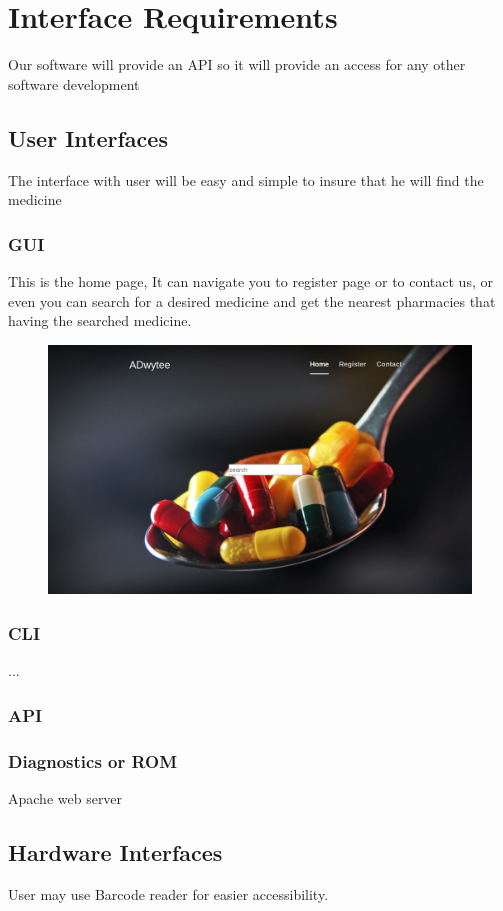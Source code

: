 \documentclass[]{article}
\begin{document}
\section{Interface Requirements}
Our software will provide an API so it will provide an access for any other software development
\subsection{User Interfaces}
The interface with user will be easy and simple to insure  that he will find the medicine
\subsubsection {GUI}
This is the home page, It can navigate you to register page or to contact us, or even you can search for a desired medicine and get the nearest pharmacies that having the searched medicine.

\begin{figure}[H]
\centering
\includegraphics[scale=0.2]{./Home}
\end{figure}

\subsubsection {CLI}
...
\subsubsection {API}

\subsubsection {Diagnostics or ROM}
Apache web server

\subsection{Hardware Interfaces}
User may use Barcode reader for easier accessibility.
\end{document}
